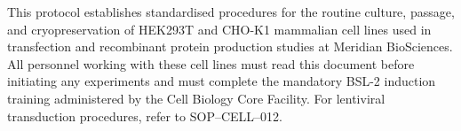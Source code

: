 \vspace{6pt}

\begin{tcolorbox}[infobox, title=\faInfoCircle\enspace Purpose \& Scope]
This protocol establishes standardised procedures for the routine culture, passage, and
cryopreservation of HEK293T and CHO-K1 mammalian cell lines used in transfection and
recombinant protein production studies at Meridian BioSciences. All personnel working with
these cell lines must read this document before initiating any experiments and must complete
the mandatory BSL-2 induction training administered by the Cell Biology Core Facility. For
lentiviral transduction procedures, refer to SOP--CELL--012.
\end{tcolorbox}

\newpage
\pagestyle{fancy}
